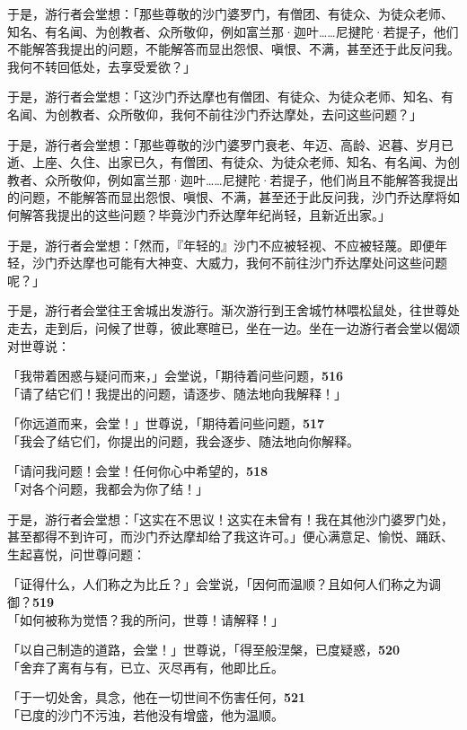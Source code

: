 于是，游行者会堂想：「那些尊敬的沙门婆罗门，有僧团、有徒众、为徒众老师、知名、有名闻、为创教者、众所敬仰，例如富兰那·迦叶……尼揵陀·若提子，他们不能解答我提出的问题，不能解答而显出怨恨、嗔恨、不满，甚至还于此反问我。我何不转回低处，去享受爱欲？」


于是，游行者会堂想：「这沙门乔达摩也有僧团、有徒众、为徒众老师、知名、有名闻、为创教者、众所敬仰，我何不前往沙门乔达摩处，去问这些问题？」

于是，游行者会堂想：「那些尊敬的沙门婆罗门衰老、年迈、高龄、迟暮、岁月已逝、上座、久住、出家已久，有僧团、有徒众、为徒众老师、知名、有名闻、为创教者、众所敬仰，例如富兰那·迦叶……尼揵陀·若提子，他们尚且不能解答我提出的问题，不能解答而显出怨恨、嗔恨、不满，甚至还于此反问我，沙门乔达摩将如何解答我提出的这些问题？毕竟沙门乔达摩年纪尚轻，且新近出家。」

于是，游行者会堂想：「然而，『年轻的』沙门不应被轻视、不应被轻蔑。即便年轻，沙门乔达摩也可能有大神变、大威力，我何不前往沙门乔达摩处问这些问题呢？」


于是，游行者会堂往王舍城出发游行。渐次游行到王舍城竹林喂松鼠处，往世尊处走去，走到后，问候了世尊，彼此寒暄已，坐在一边。坐在一边游行者会堂以偈颂对世尊说：

「我带着困惑与疑问而来，」会堂说，「期待着问些问题，\hfill{\grayfootnotesize \textbf{516}} \\
「请了结它们！我提出的问题，请逐步、随法地向我解释！」


「你远道而来，会堂！」世尊说，「期待着问些问题，\hfill{\grayfootnotesize \textbf{517}} \\
「我会了结它们，你提出的问题，我会逐步、随法地向你解释。


「请问我问题！会堂！任何你心中希望的，\hfill{\grayfootnotesize \textbf{518}} \\
「对各个问题，我都会为你了结！」


于是，游行者会堂想：「这实在不思议！这实在未曾有！我在其他沙门婆罗门处，甚至都得不到许可，而沙门乔达摩却给了我这许可。」便心满意足、愉悦、踊跃、生起喜悦，问世尊问题：


「证得什么，人们称之为比丘？」会堂说，「因何而温顺？且如何人们称之为调御？\hfill{\grayfootnotesize \textbf{519}} \\
「如何被称为觉悟？我的所问，世尊！请解释！」


「以自己制造的道路，会堂！」世尊说，「得至般涅槃，已度疑惑，\hfill{\grayfootnotesize \textbf{520}} \\
「舍弃了离有与有，已立、灭尽再有，他即比丘。


「于一切处舍，具念，他在一切世间不伤害任何，\hfill{\grayfootnotesize \textbf{521}} \\
「已度的沙门不污浊，若他没有增盛，他为温顺。


